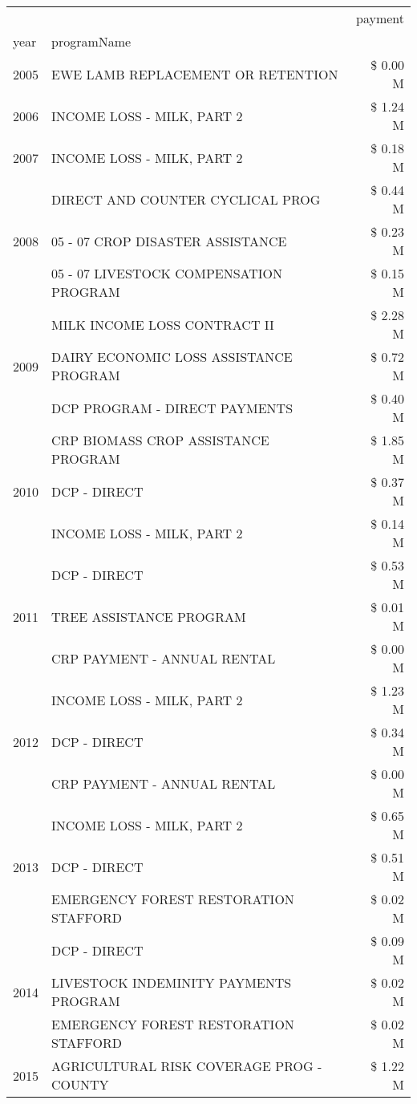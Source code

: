 \begin{tabular}{llr}
\toprule
 &  & payment \\
year & programName &  \\
\midrule
2005 & EWE LAMB REPLACEMENT OR RETENTION & \$ 0.00 M \\
\cline{1-3}
2006 & INCOME LOSS - MILK, PART 2 & \$ 1.24 M \\
\cline{1-3}
2007 & INCOME LOSS - MILK, PART 2 & \$ 0.18 M \\
\cline{1-3}
\multirow[t]{3}{*}{2008} & DIRECT AND COUNTER CYCLICAL PROG & \$ 0.44 M \\
 & 05 - 07 CROP DISASTER ASSISTANCE & \$ 0.23 M \\
 & 05 - 07 LIVESTOCK COMPENSATION PROGRAM & \$ 0.15 M \\
\cline{1-3}
\multirow[t]{3}{*}{2009} & MILK INCOME LOSS CONTRACT II & \$ 2.28 M \\
 & DAIRY ECONOMIC LOSS ASSISTANCE PROGRAM & \$ 0.72 M \\
 & DCP PROGRAM - DIRECT PAYMENTS & \$ 0.40 M \\
\cline{1-3}
\multirow[t]{3}{*}{2010} & CRP BIOMASS CROP ASSISTANCE PROGRAM & \$ 1.85 M \\
 & DCP - DIRECT & \$ 0.37 M \\
 & INCOME LOSS - MILK, PART 2 & \$ 0.14 M \\
\cline{1-3}
\multirow[t]{3}{*}{2011} & DCP - DIRECT & \$ 0.53 M \\
 & TREE ASSISTANCE PROGRAM & \$ 0.01 M \\
 & CRP PAYMENT - ANNUAL RENTAL & \$ 0.00 M \\
\cline{1-3}
\multirow[t]{3}{*}{2012} & INCOME LOSS - MILK, PART 2 & \$ 1.23 M \\
 & DCP - DIRECT & \$ 0.34 M \\
 & CRP PAYMENT - ANNUAL RENTAL & \$ 0.00 M \\
\cline{1-3}
\multirow[t]{3}{*}{2013} & INCOME LOSS - MILK, PART 2 & \$ 0.65 M \\
 & DCP - DIRECT & \$ 0.51 M \\
 & EMERGENCY FOREST RESTORATION STAFFORD & \$ 0.02 M \\
\cline{1-3}
\multirow[t]{3}{*}{2014} & DCP - DIRECT & \$ 0.09 M \\
 & LIVESTOCK INDEMINITY PAYMENTS PROGRAM & \$ 0.02 M \\
 & EMERGENCY FOREST RESTORATION STAFFORD & \$ 0.02 M \\
\cline{1-3}
\multirow[t]{3}{*}{2015} & AGRICULTURAL RISK COVERAGE PROG - COUNTY & \$ 1.22 M \\

\end{tabular}
